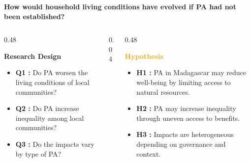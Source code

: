 \documentclass[
  ignorenonframetext,
  aspectratio=169,
]{beamer}
\begin{document}
\begin{frame}{\textbf{How would household living conditions have evolved
if PA had not been established?}}
\protect{}\label{how-would-household-living-conditions-have-evolved-if-pa-had-not-been-established}
\begin{columns}[T]

\begin{column}{0.48\linewidth}

\textcolor{vertfonce}{\textbf{Research Design}}

\small
\begin{itemize}
\item \textbf{Q1 :} Do PA worsen the living conditions of local communities?
\item \textbf{Q2 :} Do PA increase inequality among local communities?
\item \textbf{Q3 :} Do the impacts vary by type of PA?
\end{itemize}

\end{column}

\begin{column}{0.04\linewidth}
\end{column}

\begin{column}{0.48\linewidth}

\textcolor{orange}{\textbf{Hypothesis}}

\small
\begin{itemize}
\item \textbf{H1 :} PA in Madagascar may reduce well-being by limiting access to natural resources.
\item \textbf{H2 :} PA may increase inequality through uneven access to benefits.
\item \textbf{H3 :} Impacts are heterogeneous depending on governance and context.
\end{itemize}

\end{column}

\end{columns}
\end{frame}
\end{document}
